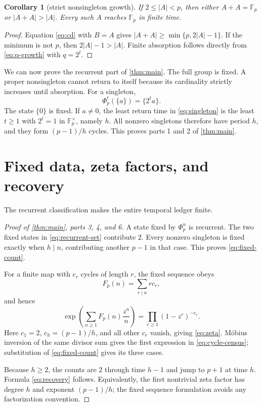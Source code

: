 \documentclass[11pt,a4paper]{amsart}
\newtheorem{corollary}[theorem]{Corollary}
\theoremstyle{definition}
\theoremstyle{remark}
\newcommand{\Fp}{\mathbb F_p}
\newcommand{\card}[1]{\lvert #1\rvert}
\begin{document}
\begin{corollary}[strict nonsingleton growth]\label{cor:strict}
If $2\leq\card A<p$, then either $A+A=\Fp$ or
$\card{A+A}>\card A$.  Every such $A$ reaches $\Fp$ in finite time.
\end{corollary}

\begin{proof}
Equation \eqref{eq:cd} with $B=A$ gives
$\card{A+A}\geq\min\{p,2\card A-1\}$.  If the minimum is not $p$, then
$2\card A-1>\card A$.  Finite absorption follows directly from
\eqref{eq:q-growth} with $q=2^t$.
\end{proof}

We can now prove the recurrent part of \cref{thm:main}.  The full group is
fixed.  A proper nonsingleton cannot return to itself because its
cardinality strictly increases until absorption.  For a singleton,
\begin{equation}\label{eq:singleton}
 \Phi_p^t(\{a\})=\{2^ta\}.
\end{equation}
The state $\{0\}$ is fixed.  If $a\ne0$, the least return time in
\eqref{eq:singleton} is the least $t\geq1$ with $2^t=1$ in
$\Fp^\times$, namely $h$.  All nonzero singletons therefore have period
$h$, and they form $(p-1)/h$ cycles.  This proves parts 1 and 2 of
\cref{thm:main}.

\section{Fixed data, zeta factors, and recovery}\label{sec:periodic}

The recurrent classification makes the entire temporal ledger finite.

\begin{proof}[Proof of \cref{thm:main}, parts 3, 4, and 6]
A state fixed by $\Phi_p^n$ is recurrent.  The two fixed states in
\eqref{eq:recurrent-set} contribute $2$.  Every nonzero singleton is fixed
exactly when $h\mid n$, contributing another $p-1$ in that case.  This
proves \eqref{eq:fixed-count}.

For a finite map with $c_r$ cycles of length $r$, the fixed sequence obeys
\[
 F_p(n)=\sum_{r\mid n}r c_r,
\]
and hence
\[
 \exp\!\left(\sum_{n\geq1}F_p(n)\frac{z^n}{n}\right)
 =\prod_{r\geq1}(1-z^r)^{-c_r}.
\]
Here $c_1=2$, $c_h=(p-1)/h$, and all other $c_r$ vanish, giving
\eqref{eq:zeta}.  M\"obius inversion of the same divisor sum gives the first
expression in \eqref{eq:cycle-census}; substitution of
\eqref{eq:fixed-count} gives its three cases.

Because $h\geq2$, the counts are $2$ through time $h-1$ and jump to $p+1$
at time $h$.  Formula \eqref{eq:recovery} follows.  Equivalently, the first
nontrivial zeta factor has degree $h$ and exponent $(p-1)/h$; the fixed
sequence formulation avoids any factorization convention.
\end{proof}
\end{document}

